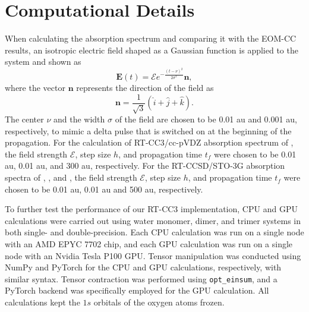 \section{Computational Details} \label{comp_cc3} 
When calculating the absorption spectrum and comparing it with the EOM-CC results, an isotropic electric field shaped as a Gaussian function is applied to the system and shown as
\begin{equation}
\textbf{E}(t) = \mathcal{E}e^{-\frac{(t-\nu)^{2}}{2\sigma^{2}}}\textbf{n},
\end{equation}
where the vector $\textbf{n}$ represents the direction of the field as 
\begin{equation}
\textbf{n} = \frac{1}{\sqrt{3}}(\hat{i}+\hat{j}+\hat{k}).
\end{equation}
The center $\nu$ and the width $\sigma$ of the field are chosen to be 0.01 au and 0.001 au, respectively, to mimic a delta pulse that is switched on at the beginning of the propagation. For the calculation of RT-CC3/cc-pVDZ absorption spectrum of , the field strength $\mathcal{E}$, step size $h$, and propagation time $t_{f}$ were chosen to be 0.01 au, 0.01 au, and 300 au, respectively. For the RT-CCSD/STO-3G absorption spectra of , , and , the field strength $\mathcal{E}$, step size $h$, and propagation time $t_{f}$ were chosen to be 0.01 au, 0.01 au and 500 au, respectively.

To further test the performance of our RT-CC3 implementation, CPU and GPU calculations were carried out using water monomer, dimer, and trimer systems in both single- and double-precision. Each CPU calculation was run on a single node with an AMD EPYC 7702 chip, and each GPU calculation was run on a single node with an Nvidia Tesla P100 GPU. Tensor manipulation was conducted using NumPy\cite{Harris2020} and PyTorch\cite{Paszke2019} for the CPU and GPU calculations, respectively, with similar syntax. Tensor contraction was performed using {\tt opt\_einsum},\cite{Smith2018} and a PyTorch backend was specifically employed for the GPU calculation. All calculations kept the $1s$ orbitals of the oxygen atoms frozen.


